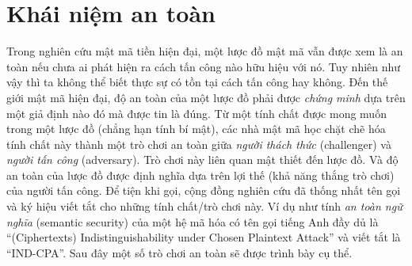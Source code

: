 \documentclass[class=report, crop=false]{standalone}
\begin{document}
	\section{Khái niệm an toàn}
		Trong nghiên cứu mật mã tiền hiện đại, một lược đồ mật mã vẫn được xem là an toàn nếu chưa ai phát hiện ra cách tấn công nào hữu hiệu với nó. Tuy nhiên như vậy thì ta không thể biết thực sự có tồn tại cách tấn công hay không. Đến thế giới mật mã hiện đại, độ an toàn của một lược đồ phải được \emph{chứng minh} dựa trên một giả định nào đó mà được tin là đúng. Từ một tính chất được mong muốn trong một lược đồ (chẳng hạn tính bí mật), các nhà mật mã học chặt chẽ hóa tính chất này thành một trò chơi an toàn giữa \textit{người thách thức} (challenger) và \textit{người tấn công} (adversary). Trò chơi này liên quan mật thiết đến lược đồ. Và độ an toàn của lược đồ được định nghĩa dựa trên lợi thế (khả năng thắng trò chơi) của người tấn công. Để tiện khi gọi, cộng đồng nghiên cứu đã thống nhất tên gọi và ký hiệu viết tắt cho những tính chất/trò chơi này. Ví dụ như tính \textit{an toàn ngữ nghĩa} (semantic security) của một hệ mã hóa có tên gọi tiếng Anh đầy dủ là ``(Ciphertexts) Indistinguishability under Chosen Plaintext Attack'' và viết tắt là ``IND-CPA''. Sau đây một số trò chơi an toàn sẽ được trình bày cụ thể.
\end{document}
